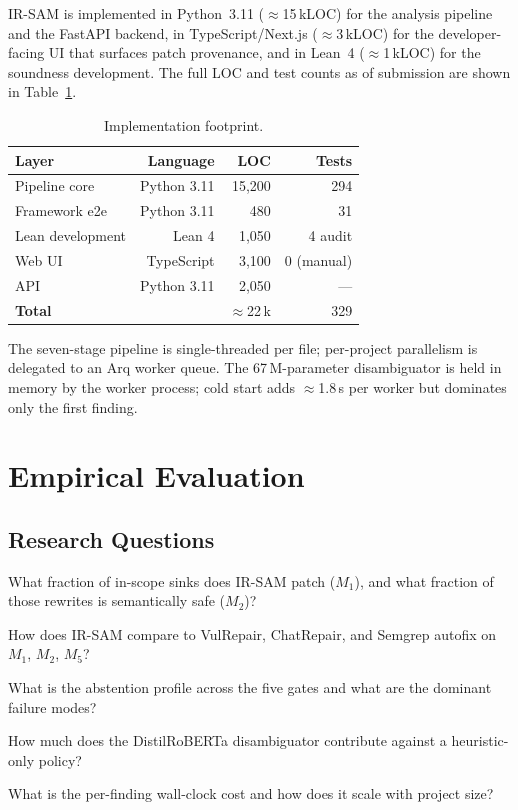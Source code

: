 \documentclass[conference]{IEEEtran}
\newcommand{\IRSAM}{\textsc{IR-SAM}}
\newcommand{\rqref}[1]{RQ\ref{rq:#1}}
\begin{document}
\IRSAM{} is implemented in Python~3.11 ($\approx$15\,kLOC) for the
analysis pipeline and the FastAPI backend, in TypeScript/Next.js
($\approx$3\,kLOC) for the developer-facing UI that surfaces patch
provenance, and in Lean~4 ($\approx$1\,kLOC) for the soundness
development. The full LOC and test counts as of submission are
shown in Table~\ref{tab:impl}.

\begin{table}[t]
\caption{Implementation footprint.}\label{tab:impl}
\centering\small
\begin{tabular}{lrrr}
\toprule
Layer            & Language     & LOC   & Tests \\
\midrule
Pipeline core    & Python 3.11  & 15{,}200 & 294 \\
Framework e2e    & Python 3.11  & 480     & 31 \\
Lean development & Lean 4       & 1{,}050  & 4 audit \\
Web UI           & TypeScript   & 3{,}100  & 0 (manual) \\
API              & Python 3.11  & 2{,}050  & --- \\
\midrule
\textbf{Total}   &              & $\approx$22\,k & 329 \\
\bottomrule
\end{tabular}
\end{table}

The seven-stage pipeline is single-threaded per file; per-project
parallelism is delegated to an Arq worker queue.  The 67\,M-parameter
disambiguator is held in memory by the worker process; cold start
adds $\approx$1.8\,s per worker but dominates only the first finding.

\section{Empirical Evaluation}\label{sec:eval}

\subsection{Research Questions}
\begin{description}[leftmargin=*]
\item[\rqref{m1m2}] What fraction of in-scope sinks does
\IRSAM{} patch ($M_1$), and what fraction of those rewrites is
semantically safe ($M_2$)?
\item[\rqref{baseline}] How does \IRSAM{} compare to VulRepair,
ChatRepair, and Semgrep autofix on $M_1$, $M_2$, $M_5$?
\item[\rqref{abstain}] What is the abstention profile across the
five gates and what are the dominant failure modes?
\item[\rqref{ablation}] How much does the
DistilRoBERTa disambiguator contribute against a heuristic-only
policy?
\item[\rqref{cost}] What is the per-finding wall-clock cost and how
does it scale with project size?
\end{description}
\end{document}
